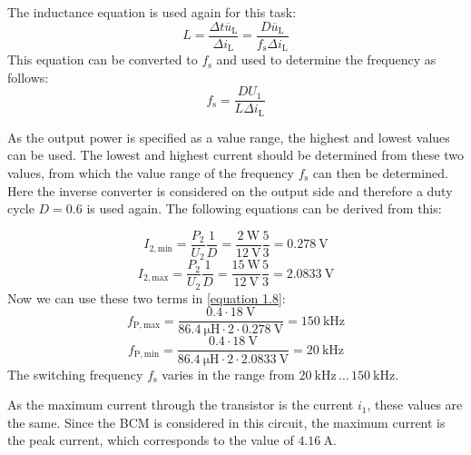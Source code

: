  \begin{solutionblock}
     The inductance equation is used again for this task:
     \begin{equation}
        L = \frac{\Delta t \overline u_{\mathrm{L}}}{\Delta i_{\mathrm{L}}}= \frac{D \overline u_{\mathrm{L}}}{f_\mathrm{s}\Delta i_{\mathrm{L}}}
     \end{equation}
     This equation can be converted to $f_\mathrm{s}$ and used to determine the frequency as follows:
     \begin{equation}
        f_\mathrm{s} = \frac{DU_{\mathrm{1}}}{L\Delta i_{\mathrm{L}}} \label{equation 1.8}
     \end{equation}
      
As the output power is specified as a value range, the highest and lowest values can be used. The lowest and highest current should be determined from these two values, from which the value range of the frequency $f_\mathrm{s}$ can then be determined. Here the inverse converter is considered on the output side and therefore a duty cycle $D = 0.6$ is used again. The following equations can be derived from this:

     \begin{equation}
        I_\mathrm{2,min}= \frac{P_\mathrm{2}}{U_\mathrm{2}}\frac{1}{D}=\frac{\SI{2}{\watt}}{\SI{12}{\volt}}\frac{5}{3}=\SI{0.278}{\volt}
     \end{equation}
     \begin{equation}
        I_\mathrm{2,max}= \frac{P_\mathrm{2}}{U_\mathrm{2}}\frac{1}{D}=\frac{\SI{15}{\watt}}{\SI{12}{\volt}}\frac{5}{3}=\SI{2.0833}{\volt}
     \end{equation}
     Now we can use these two terms in \ref{equation 1.8}:
     \begin{equation}
        f_\mathrm{P,max}=\frac{0.4\cdot\SI{18}{\volt}}{\SI{86.4}{\micro\henry}\cdot 2\cdot \SI{0.278}{\volt}}=\SI{150}{\kilo \hertz}
     \end{equation}
     \begin{equation}
        f_\mathrm{P,min}=\frac{0.4\cdot\SI{18}{\volt}}{\SI{86.4}{\micro\henry}\cdot 2\cdot \SI{2.0833}{\volt}}=\SI{20}{\kilo \hertz}
     \end{equation}
     The switching frequency $f_\mathrm{s}$ varies in the range from $\SI{20}{\kilo \hertz} \, \dots \, \SI{150}{\kilo \hertz}$.
 \end{solutionblock}

 \begin{solutionblock}
    As the maximum current through the transistor is the current $i_1$, these values are the same. Since the BCM is considered in this circuit, the maximum current is the peak current, which corresponds to the value of $\SI{4.16}{\ampere}$.
 \end{solutionblock}


